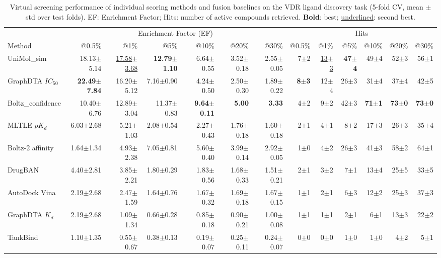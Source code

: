 \begin{table}[htbp!]
\centering
\caption{Virtual screening performance of individual scoring methods and fusion baselines on the VDR ligand discovery task (5-fold CV, mean $\pm$ std over test folds). EF: Enrichment Factor; Hits: number of active compounds retrieved. \textbf{Bold}: best; \underline{underlined}: second best.}
\label{tab:fusion_performance}
\small
\begin{tabular}{lrrrrrr|rrrrrr}
\toprule
& \multicolumn{6}{c|}{Enrichment Factor (EF)} & \multicolumn{6}{c}{Hits} \\
Method & @0.5\% & @1\% & @5\% & @10\% & @20\% & @30\% & @0.5\% & @1\% & @5\% & @10\% & @20\% & @30\% \\
\midrule
UniMol_sim & 18.13$\pm$5.14 & \underline{17.58$\pm$3.68} & \textbf{12.79$\pm$1.10} & 6.64$\pm$0.55 & 3.52$\pm$0.18 & 2.55$\pm$0.05 & 7$\pm$2 & \underline{13$\pm$3} & \textbf{47$\pm$4} & 49$\pm$4 & 52$\pm$3 & 56$\pm$1 \\
GraphDTA $IC_{50}$ & \textbf{22.49$\pm$7.84} & 16.20$\pm$5.12 & 7.16$\pm$0.90 & 4.24$\pm$0.50 & 2.50$\pm$0.30 & 1.89$\pm$0.22 & \textbf{8$\pm$3} & 12$\pm$4 & 26$\pm$3 & 31$\pm$4 & 37$\pm$4 & 42$\pm$5 \\
Boltz_confidence & 10.40$\pm$6.76 & 12.89$\pm$3.04 & 11.37$\pm$0.83 & \textbf{9.64$\pm$0.11} & \textbf{5.00} & \textbf{3.33} & 4$\pm$2 & 9$\pm$2 & 42$\pm$3 & \textbf{71$\pm$1} & \textbf{73$\pm$0} & \textbf{73$\pm$0} \\
MLTLE $pK_d$ & 6.03$\pm$2.68 & 5.21$\pm$1.03 & 2.08$\pm$0.54 & 2.27$\pm$0.43 & 1.76$\pm$0.18 & 1.60$\pm$0.18 & 2$\pm$1 & 4$\pm$1 & 8$\pm$2 & 17$\pm$3 & 26$\pm$3 & 35$\pm$4 \\
Boltz-2 affinity & 1.64$\pm$1.34 & 4.93$\pm$2.38 & 7.05$\pm$0.81 & 5.60$\pm$0.40 & 3.99$\pm$0.14 & 2.92$\pm$0.05 & 1$\pm$0 & 4$\pm$2 & 26$\pm$3 & 41$\pm$3 & 58$\pm$2 & 64$\pm$1 \\
DrugBAN & 4.40$\pm$2.81 & 3.85$\pm$2.21 & 1.80$\pm$0.29 & 1.83$\pm$0.56 & 1.68$\pm$0.33 & 1.51$\pm$0.21 & 2$\pm$1 & 3$\pm$2 & 7$\pm$1 & 13$\pm$4 & 25$\pm$5 & 33$\pm$5 \\
AutoDock Vina & 2.19$\pm$2.68 & 2.47$\pm$1.59 & 1.64$\pm$0.76 & 1.67$\pm$0.32 & 1.69$\pm$0.18 & 1.67$\pm$0.15 & 1$\pm$1 & 2$\pm$1 & 6$\pm$3 & 12$\pm$2 & 25$\pm$3 & 37$\pm$3 \\
GraphDTA $K_{d}$ & 2.19$\pm$2.68 & 1.09$\pm$1.34 & 0.66$\pm$0.28 & 0.85$\pm$0.18 & 0.90$\pm$0.21 & 1.00$\pm$0.08 & 1$\pm$1 & 1$\pm$1 & 2$\pm$1 & 6$\pm$1 & 13$\pm$3 & 22$\pm$2 \\
TankBind & 1.10$\pm$1.35 & 0.55$\pm$0.67 & 0.38$\pm$0.13 & 0.19$\pm$0.07 & 0.25$\pm$0.11 & 0.24$\pm$0.07 & 0$\pm$0 & 0$\pm$0 & 1$\pm$0 & 1$\pm$0 & 4$\pm$2 & 5$\pm$1 \\

\end{tabular}
\end{table}
